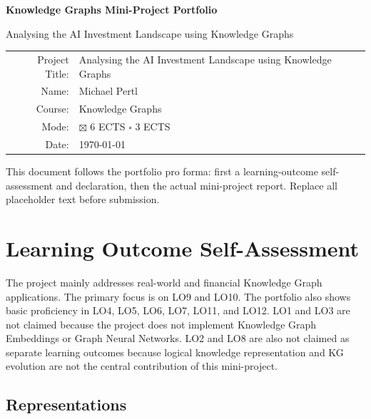 \documentclass[11pt,a4paper]{article}
\newcommand{\projecttitle}{Analysing the AI Investment Landscape using Knowledge Graphs}
\newcommand{\studentname}{Michael Pertl}
\newcommand{\coursename}{Knowledge Graphs}
\newcommand{\submissiondate}{\today}
\newcommand{\checkedbox}{\(\boxtimes\)}
\newcommand{\emptybox}{\(\square\)}
\begin{document}
\begin{titlepage}
  \centering
  \vspace*{2cm}
  {\LARGE \textbf{Knowledge Graphs Mini-Project Portfolio}\par}
  \vspace{1.5cm}
  {\Large \projecttitle\par}
  \vspace{2cm}
  \begin{tabular}{rl}
    Project Title: & \projecttitle \\
    Name: & \studentname \\
    Course: & \coursename \\
    Mode: & \checkedbox{} 6 ECTS \quad \emptybox{} 3 ECTS \\
    Date: & \submissiondate \\
  \end{tabular}
  \vfill
  \begin{minipage}{0.86\textwidth}
    \small
    This document follows the portfolio pro forma: first a learning-outcome
    self-assessment and declaration, then the actual mini-project report.
    Replace all placeholder text before submission.
  \end{minipage}
\end{titlepage}

\section*{Learning Outcome Self-Assessment}

The project mainly addresses real-world and financial Knowledge Graph
applications. The primary focus is on LO9 and LO10. The portfolio also shows
basic proficiency in LO4, LO5, LO6, LO7, LO11, and LO12. LO1 and LO3 are not
claimed because the project does not implement Knowledge Graph Embeddings or
Graph Neural Networks. LO2 and LO8 are also not claimed as separate learning
outcomes because logical knowledge representation and KG evolution are not the
central contribution of this mini-project.

\subsection*{Representations}
\end{document}
